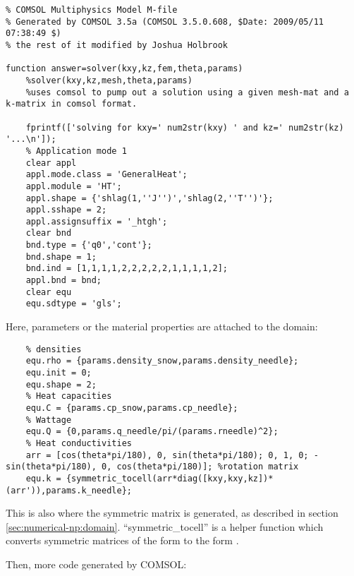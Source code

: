 \small
\begin{verbatim}
% COMSOL Multiphysics Model M-file
% Generated by COMSOL 3.5a (COMSOL 3.5.0.608, $Date: 2009/05/11 07:38:49 $)
% the rest of it modified by Joshua Holbrook

function answer=solver(kxy,kz,fem,theta,params)
    %solver(kxy,kz,mesh,theta,params)
    %uses comsol to pump out a solution using a given mesh-mat and a k-matrix in comsol format.

    fprintf(['solving for kxy=' num2str(kxy) ' and kz=' num2str(kz) '...\n']);
    % Application mode 1
    clear appl
    appl.mode.class = 'GeneralHeat';
    appl.module = 'HT';
    appl.shape = {'shlag(1,''J'')','shlag(2,''T'')'};
    appl.sshape = 2;
    appl.assignsuffix = '_htgh';
    clear bnd
    bnd.type = {'q0','cont'};
    bnd.shape = 1;
    bnd.ind = [1,1,1,1,2,2,2,2,2,1,1,1,1,2];
    appl.bnd = bnd;
    clear equ
    equ.sdtype = 'gls';
\end{verbatim}
\normalsize

Here, parameters or the material properties are attached to the domain:

\small
\begin{verbatim}
    % densities
    equ.rho = {params.density_snow,params.density_needle};
    equ.init = 0;
    equ.shape = 2;
    % Heat capacities
    equ.C = {params.cp_snow,params.cp_needle};
    % Wattage
    equ.Q = {0,params.q_needle/pi/(params.rneedle)^2};
    % Heat conductivities
    arr = [cos(theta*pi/180), 0, sin(theta*pi/180); 0, 1, 0; -sin(theta*pi/180), 0, cos(theta*pi/180)]; %rotation matrix
    equ.k = {symmetric_tocell(arr*diag([kxy,kxy,kz])*(arr')),params.k_needle};
\end{verbatim}
\normalsize

This is also where the symmetric matrix is generated, as described in section
\ref{sec:numerical-np:domain}. ``symmetric\_tocell'' is a helper function which
converts symmetric matrices of the form 
 to the form
.

Then, more code generated by COMSOL:

